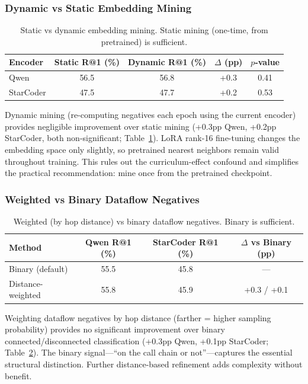\documentclass[11pt]{article}
\begin{document}
\subsubsection{Dynamic vs Static Embedding Mining}
\label{sec:dynamic_mining}

\begin{table}[h]
\centering
\caption{Static vs dynamic embedding mining. Static mining (one-time, from pretrained) is sufficient.}
\label{tab:dynamic}
\begin{tabular}{lcccc}
\toprule
\textbf{Encoder} & \textbf{Static R@1 (\%)} & \textbf{Dynamic R@1 (\%)} & \textbf{$\Delta$ (pp)} & $p$\textbf{-value} \\
\midrule
Qwen & 56.5 & 56.8 & +0.3 & 0.41 \\
StarCoder & 47.5 & 47.7 & +0.2 & 0.53 \\
\bottomrule
\end{tabular}
\end{table}

Dynamic mining (re-computing negatives each epoch using the current encoder) provides negligible improvement over static mining (+0.3pp Qwen, +0.2pp StarCoder, both non-significant; Table~\ref{tab:dynamic}).
LoRA rank-16 fine-tuning changes the embedding space only slightly, so pretrained nearest neighbors remain valid throughout training.
This rules out the curriculum-effect confound and simplifies the practical recommendation: mine once from the pretrained checkpoint.

\subsubsection{Weighted vs Binary Dataflow Negatives}
\label{sec:weighted}

\begin{table}[h]
\centering
\caption{Weighted (by hop distance) vs binary dataflow negatives. Binary is sufficient.}
\label{tab:weighted}
\begin{tabular}{lccc}
\toprule
\textbf{Method} & \textbf{Qwen R@1 (\%)} & \textbf{StarCoder R@1 (\%)} & \textbf{$\Delta$ vs Binary (pp)} \\
\midrule
Binary (default) & 55.5 & 45.8 & --- \\
Distance-weighted & 55.8 & 45.9 & +0.3 / +0.1 \\
\bottomrule
\end{tabular}
\end{table}

Weighting dataflow negatives by hop distance (farther = higher sampling probability) provides no significant improvement over binary connected/disconnected classification (+0.3pp Qwen, +0.1pp StarCoder; Table~\ref{tab:weighted}).
The binary signal---``on the call chain or not''---captures the essential structural distinction.
Further distance-based refinement adds complexity without benefit.
\end{document}
